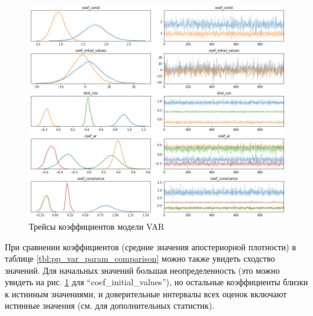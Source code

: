 \documentclass[a4paper,14pt]{extreport}
\begin{document}
\begin{figure}[H]
	\includegraphics[width=\linewidth]{img/gen/pp_var_trace.png}
	\caption{Трейсы коэффициентов модели VAR}
	\label{fig:pp_var_trace}
\end{figure}

При сравнении коэффициентов (средние значения апостериорной плотности) в таблице \ref{tbl:pp_var_param_comparison} можно также увидеть сходство значений. Для начальных значений большая неопределенность (это можно увидеть на рис. \ref{fig:pp_var_trace} для ``coef\_initial\_values''), но остальные коэффициенты близки к истинным значениями, и доверительные интервалы всех оценок включают истинные значения (см.  для дополнительных статистик).
\end{document}
